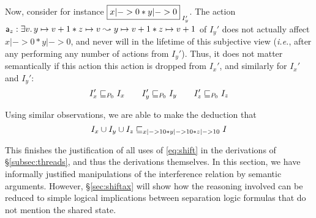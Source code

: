 Now, consider for instance $\shared{x|->0 * y|->0}{I_y'}$.  The action
$\mathsf{a}_z: \exists v.\, y \mapsto v+1 * z \mapsto v \mathrel{\leadsto} y \mapsto v+1
* z \mapsto v+1$ of $I_y'$ does not actually affect $x|->0 * y|->0$,
and never will in the lifetime of this subjective view (\textit{i.e.},
after any performing any number of actions from $I_y'$). Thus, it does
not matter semantically if this action this action is dropped from
$I_x'$, and similarly for $I_x'$ and $I_y'$:
\[
I_x'\sqsubseteq_{P_0} I_x
\qquad
I_y'\sqsubseteq_{P_0} I_y
\qquad
I_z'\sqsubseteq_{P_0} I_z
\]

Using similar observations, we are able to make the deduction that
\[
I_x\cup I_y\cup I_z\sqsubseteq_{x|->10 * y|->10 * z|->10} I
\]

This finishes the justification of all uses of \eqref{eq:shift} in the
derivations of \S\ref{subsec:threads}, and thus the derivations
themselves.  In this section, we have informally justified
manipulations of the interference relation by semantic
arguments. However, \S\ref{sec:shiftax} will show how the reasoning
involved can be reduced to simple logical implications between
separation logic formulas that do not mention the shared state.

